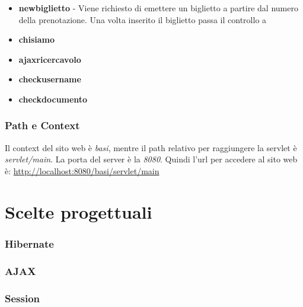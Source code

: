 \documentclass[a4paper,10pt]{article}
\begin{document}
\begin{itemize}
 \item \textbf{newbiglietto} - Viene richiesto di emettere un biglietto a partire dal numero della prenotazione. Una volta inserito il biglietto passa il controllo a 
 \item \textbf{chisiamo} 
 \item \textbf{ajaxricercavolo}
 \item \textbf{checkusername}
 \item \textbf{checkdocumento}
\end{itemize}

\section{Path e Context}
Il context del sito web \`e \textit{basi}, mentre il path relativo per raggiungere la servlet \`e \textit{servlet/main}. La porta del server \`e la \textit{8080}.
Quindi l'url per accedere al sito web \`e: \url{http://localhost:8080/basi/servlet/main}


\part{Scelte progettuali}

\section{Hibernate}
\section{AJAX}
\section{Session}
\end{document}
